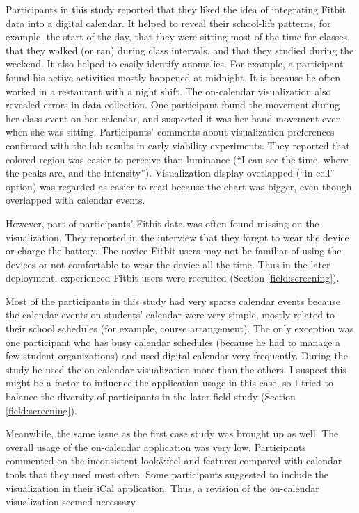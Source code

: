 \documentclass[12pt,oneside]{book}
\begin{document}
Participants in this study reported that they liked the idea of integrating Fitbit data into a digital calendar. It helped to reveal their school-life patterns, for example, the start of the day, that they were sitting most of the time for classes, that they walked (or ran) during class intervals, and that they studied during the weekend. It also helped to easily identify anomalies. For example, a participant found his active activities mostly happened at midnight. It is because he often worked in a restaurant with a night shift. The on-calendar visualization also revealed errors in data collection. One participant found the movement during her class event on her calendar, and suspected it was her hand movement even when she was sitting. Participants' comments about visualization preferences confirmed with the lab results in early viability experiments. They reported that colored region was easier to perceive than luminance (``I can see the time, where the peaks are, and the intensity''). Visualization display overlapped (``in-cell'' option) was regarded as easier to read because the chart was bigger, even though overlapped with calendar events.

However, part of participants' Fitbit data was often found missing on the visualization. They reported in the interview that they forgot to wear the device or charge the battery. The novice Fitbit users may not be familiar of using the devices or not comfortable to wear the device all the time. Thus in the later deployment, experienced Fitbit users were recruited (Section \ref{field:screening}).

Most of the participants in this study had very sparse calendar events because the calendar events on students' calendar were very simple, mostly related to their school schedules (for example, course arrangement). The only exception was one participant who has busy calendar schedules (because he had to manage a few student organizations) and used digital calendar very frequently. During the study he used the on-calendar visualization more than the others. I suspect this might be a factor to influence the application usage in this case, so I tried to balance the diversity of participants in the later field study (Section \ref{field:screening}).

Meanwhile, the same issue as the first case study was brought up as well. The overall usage of the on-calendar application was very low. Participants commented on the inconsistent look\&feel and features compared with calendar tools that they used most often. Some participants suggested to include the visualization in their iCal application. Thus, a revision of the on-calendar visualization seemed necessary.
\end{document}
